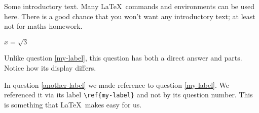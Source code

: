 \documentclass{exam}
\begin{document}
Some introductory text.  Many \LaTeX\ commands and environments can be used
here. There is a good chance that you won't want any introductory text; at least
not for maths homework.
\begin{questions}

\question
\(x = \sqrt{3}\)

\question
\label{my-label}

\question
\label{another-label}
Unlike question \ref{my-label}, this question has both a direct answer and
parts.  Notice how its display differs.


\question
\label{yet-another-label}
In question \ref{another-label} we made reference to question \ref{my-label}.
We referenced it via its label \verb!\ref{my-label}! and not by its question
number.  This is something that \LaTeX\ makes easy for us.

\end{questions}
\end{document}
